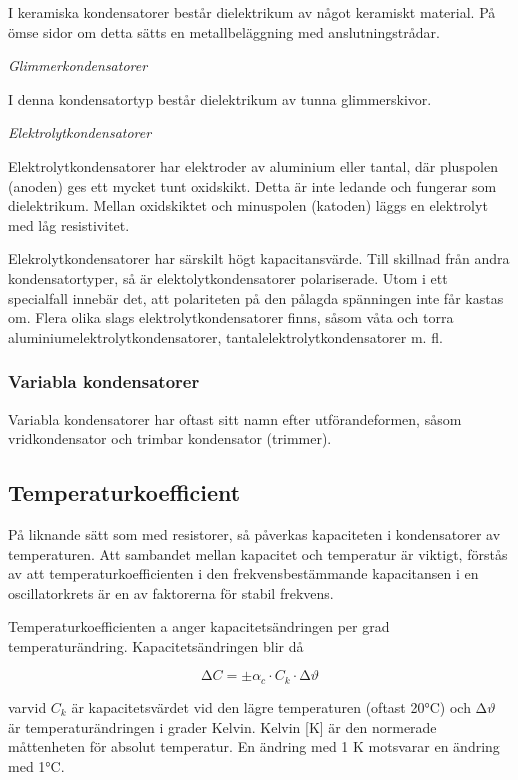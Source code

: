 I keramiska kondensatorer består dielektrikum av något keramiskt material. På
ömse sidor om detta sätts en metallbeläggning med anslutningstrådar.

\emph{Glimmerkondensatorer}

I denna kondensatortyp består dielektrikum av tunna glimmerskivor.

\emph{Elektrolytkondensatorer}

Elektrolytkondensatorer har elektroder av aluminium eller tantal, där pluspolen
(anoden) ges ett mycket tunt oxidskikt. Detta är inte ledande och fungerar som
dielektrikum. Mellan oxidskiktet och minuspolen (katoden) läggs en elektrolyt
med låg resistivitet.

Elekrolytkondensatorer har särskilt högt kapacitansvärde. Till skillnad från
andra kondensatortyper, så är elektolytkondensatorer polariserade. Utom i ett
specialfall innebär det, att polariteten på den pålagda spänningen inte får
kastas om. Flera olika slags elektrolytkondensatorer finns, såsom våta
och torra aluminiumelektrolytkondensatorer, tantalelektrolytkondensatorer m. fl.

\subsubsection{Variabla kondensatorer}
Variabla kondensatorer har oftast sitt namn efter utförandeformen, såsom
vridkondensator och trimbar kondensator (trimmer).

\subsection{Temperaturkoefficient}

På liknande sätt som med resistorer, så påverkas kapaciteten i kondensatorer av
temperaturen. Att sambandet mellan kapacitet och temperatur är viktigt, förstås
av att temperaturkoefficienten i den frekvensbestämmande kapacitansen i en
oscillatorkrets är en av faktorerna för stabil frekvens.

Temperaturkoefficienten a anger kapacitetsändringen per grad temperaturändring.
Kapacitetsändringen blir då

\[∆C = \pm \alpha _c \cdot C_k \cdot ∆\vartheta\]

varvid \(C_k\) är kapacitetsvärdet vid den lägre temperaturen (oftast 20°C) och
\(∆\vartheta\) är temperaturändringen i grader Kelvin.
Kelvin [K] är den normerade måttenheten för absolut temperatur.
En ändring med 1 K motsvarar en ändring med 1°C.

